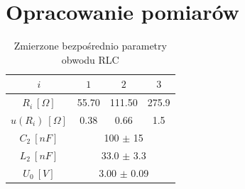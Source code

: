 \documentclass[12pt, a4paper, oneside]{article}
\begin{document}
\section{Opracowanie pomiarów}
\begin{table}[h!]
  \centering
  \caption{Zmierzone bezpośrednio parametry obwodu RLC}
    \begin{tabular}{|c|c|c|c|}\hline
    $i$ & $1$ & $2$ & $3$ \\\hline
    $R_i~[\Omega]$ & 55.70 & 111.50 & 275.9 \\\hline
    $u(R_i)~[\Omega]$ & 0.38 & 0.66 & 1.5 \\\hline
    $C_2~[nF]$ & \multicolumn{3}{|c|}{100 $\pm$ 15} \\\hline
    $L_2~[nF]$ & \multicolumn{3}{|c|}{33.0 $\pm$ 3.3} \\\hline
    $U_0~[V]$ & \multicolumn{3}{|c|}{3.00 $\pm$ 0.09} \\\hline
    \end{tabular}%
  \label{tab:addlabel}%
\end{table}%
\end{document}
